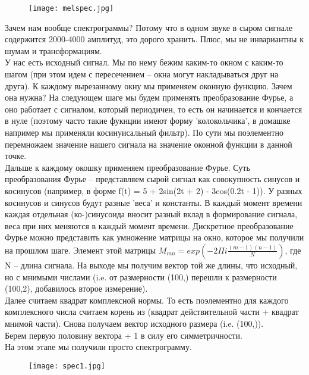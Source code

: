 \begin{figure}[H]
	\centering
	\texttt{[image: melspec.jpg]}
\end{figure}

Зачем нам вообще спектрограммы? Потому что в одном звуке в сыром сигнале содержится 2000-4000 амплитуд, это дорого хранить. Плюс, мы не инвариантны к шумам и трансформациям. \\

У нас есть исходный сигнал. Мы по нему бежим каким-то окном с каким-то шагом (при этом идем с пересечением -- окна могут накладываться друг на друга). К каждому вырезанному окну мы применяем оконную функцию. Зачем она нужна? На следующем шаге мы будем применять преобразование Фурье, а оно работает с сигналом, который периодичен, то есть он начинается и кончается в нуле (поэтому часто такие фукнции имеют форму 'колокольчика', в домашке например мы применяли косинуисальный фильтр). По сути мы поэлементно перемножаем значение нашего сигнала на значение оконной функции в данной точке. \\ 

Дальше к каждому окошку применяем преобразование Фурье. Суть преобразования Фурье -- представляем сырой сигнал как совокупность синусов и косинусов (например, в форме f(t) = 5 + 2sin(2t + 2) - 3cos(0.2t - 1)). У разных косинусов и синусов будут разные 'веса' и константы. В каждый момент времени каждая отдельная (ко-)синусоида вносит разный вклад в формирование сигнала, веса при них меняются в каждый момент времени. Дискретное преобразование Фурье можно представить как умножение матрицы на окно, которое мы получили на прошлом шаге. Элемент этой матрицы $M_{mn} = exp(-2\Pi i\frac{(m - 1)(n - 1)}{N})$, где N -- длина сигнала. На выходе мы получим вектор той же длины, что исходный, но с мнимыми числами (i.e. от размерности (100,) перешли к размерности (100,2), добавилось второе измерение). \\ 

Далее считаем квадрат комплексной нормы. То есть поэлементно для каждого комплексного числа считаем корень из (квадрат действительной части + квадрат мнимой части). Снова получаем вектор исходного размера (i.e. (100,)). \\ 

Берем первую половину вектора + 1 в силу его симметричности. \\ 

На этом этапе мы получили просто спектрограмму. 
\begin{figure}[H]
	\centering
	\texttt{[image: spec1.jpg]}
\end{figure}

